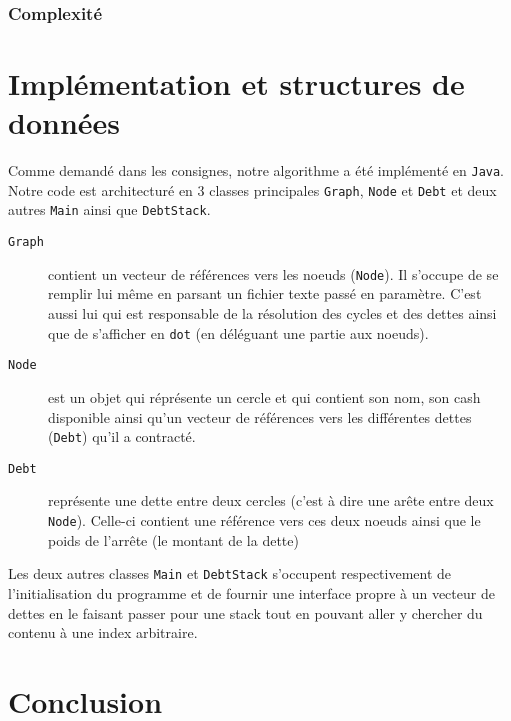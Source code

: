 \documentclass[12pt, oneside]{article}
\begin{document}
\subsubsection{Complexité}

\section{Implémentation et structures de données}
Comme demandé dans les consignes, notre algorithme a été implémenté en \texttt{Java}. Notre code est architecturé en 3 classes principales \texttt{Graph}, \texttt{Node} et \texttt{Debt} et deux autres \texttt{Main} ainsi que \texttt{DebtStack}.

\begin{description}
\item[\texttt{Graph}] contient un vecteur de références vers les noeuds (\texttt{Node}). Il s'occupe de se remplir lui même en parsant un fichier texte passé en paramètre. C'est aussi lui qui est responsable de la résolution des cycles et des dettes ainsi que de s'afficher en \texttt{dot} (en déléguant une partie aux noeuds).
\item[\texttt{Node}] est un objet qui réprésente un cercle et qui contient son nom, son cash disponible ainsi qu'un vecteur de références vers les différentes dettes 
(\texttt{Debt}) qu'il a contracté.
\item[\texttt{Debt}] représente une dette entre deux cercles (c'est à dire une arête entre deux \texttt{Node}). Celle-ci contient une référence vers ces deux noeuds ainsi que le poids de l'arrête (le montant de la dette)
\end{description}
Les deux autres classes \texttt{Main} et \texttt{DebtStack} s'occupent respectivement de l'initialisation du programme et de fournir une interface propre à un vecteur de dettes en le faisant passer pour une stack tout en pouvant aller y chercher du contenu à une index arbitraire.

\section{Conclusion}
\end{document}
